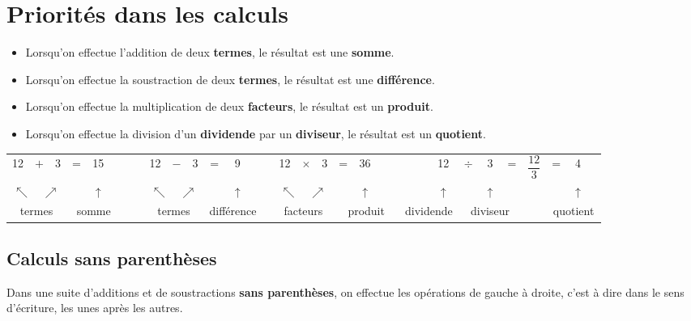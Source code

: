 \section{Priorités dans les calculs}

\begin{definition}
   \begin{itemize}
      \item Lorsqu'on effectue l'addition de deux {\bf termes}, le résultat est une {\bf somme}.
      \item Lorsqu'on effectue la soustraction de deux {\bf termes}, le résultat est une {\bf différence}.
      \item Lorsqu'on effectue la multiplication de deux {\bf facteurs}, le résultat est un {\bf produit}.
      \item Lorsqu'on effectue la division d'un {\bf dividende} par un {\bf diviseur}, le résultat est un {\bf quotient}. \\ [-10mm]
   \end{itemize}
\end{definition}

\bigskip

{\setlength{\tabcolsep}{4pt}
\begin{tabular}{*{7}{c}|*{7}{c}|*{8}{c}|*{10}{c}}
   12 & $+$ & 3 & = &15 &&&& 12 & $-$ & 3 & = & 9 &&& 12 & $\times$ & 3 & = & 36 &&&&& 12 & $\div$ & 3  & = & $\dfrac{12}{3}$ & = & 4 & \\
   \multicolumn{3}{c}{$\nwarrow \quad \nearrow$} & & $\uparrow$ &&&& \multicolumn{3}{c}{$\nwarrow \quad \nearrow$} & & $\uparrow$ &&& \multicolumn{3}{c}{$\nwarrow \quad \nearrow$} & & $\uparrow$ &&&&& $\uparrow$ & & $\uparrow$ & & & & $\uparrow$ & \\
   \multicolumn{3}{c}{\small termes} & \multicolumn{3}{c}{\small somme} &&& \multicolumn{3}{c}{\small termes} & \multicolumn{3}{c|}{\small différence} && \multicolumn{3}{c}{\small facteurs} & \multicolumn{4}{c|}{\small produit} & \multicolumn{3}{c}{\small dividende} & \multicolumn{3}{c}{\small diviseur} & & \multicolumn{3}{c}{\small quotient} \\
\end{tabular}}

\subsection{Calculs sans parenthèses}

\begin{propriete}[\admise]
Dans une suite d'additions et de soustractions \textbf{sans parenthèses}, on effectue les opérations de gauche à droite, c'est à dire dans le sens d'écriture, les unes après les autres.
\end{propriete}

